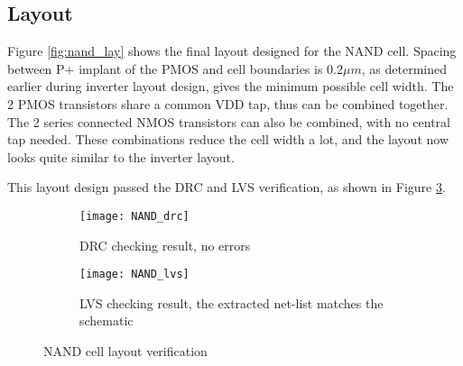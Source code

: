 \subsection{Layout}

Figure \ref{fig:nand_lay} shows the final layout designed for the NAND cell. Spacing between P+ implant of the PMOS and cell boundaries is $0.2 \mu m$, as determined earlier during inverter layout design, gives the minimum possible cell width. The 2 PMOS transistors share a common VDD tap, thus can be combined together. The 2 series connected NMOS transistors can also be combined, with no central tap needed. These combinations reduce the cell width a lot, and the layout now looks quite similar to the inverter layout.

This layout design passed the DRC and LVS verification, as shown in Figure \ref{fig:nand_vfy}.

\begin{figure}[!htb]
	\centering
	\begin{subfigure}[b]{0.5\textwidth}
		\texttt{[image: NAND\_drc]}
		\caption{DRC checking result, no errors}
		\label{fig:nand_drc}
	\end{subfigure}
	\begin{subfigure}[b]{0.4\textwidth}
		\texttt{[image: NAND\_lvs]}
		\caption{LVS checking result, the extracted net-list matches the schematic}
		\label{fig:nand_lvs}
	\end{subfigure}
	\caption{NAND cell layout verification}
	\label{fig:nand_vfy}
\end{figure}
